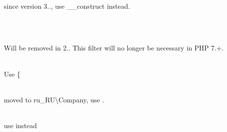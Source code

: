 \begin{DoxyRefList}
\item[Member \doxylink{class_cron_1_1_cron_expression_a20d1a6bb582a486fc44bc1de684496a1}{Cron\textbackslash{}Cron\+Expression\+::factory} (string \$expression, ?\doxylink{interface_cron_1_1_field_factory_interface}{Field\+Factory\+Interface} \$field\+Factory=null)]\hfill \\
\label{deprecated__deprecated000003}%
%
since version 3.., use \+\_\+\+\_\+construct instead.  
\item[Member \doxylink{class_cron_1_1_cron_expression_a793ba54d32ff10407653dd9ece004d34}{Cron\textbackslash{}Cron\+Expression\+::YEAR} ]\hfill \\
\label{deprecated__deprecated000002}%
%
  
\item[Class \doxylink{class_deep_copy_1_1_type_filter_1_1_date_1_1_date_interval_filter}{Deep\+Copy\textbackslash{}Type\+Filter\textbackslash{}Date\textbackslash{}Date\+Interval\+Filter} ]\hfill \\
\label{deprecated__deprecated000127}%
%
Will be removed in 2.. This filter will no longer be necessary in PHP 7.+.  
\item[Class \doxylink{class_deep_copy_1_1_type_filter_1_1_spl_1_1_spl_doubly_linked_list}{Deep\+Copy\textbackslash{}Type\+Filter\textbackslash{}Spl\textbackslash{}Spl\+Doubly\+Linked\+List} ]\hfill \\
\label{deprecated__deprecated000128}%
%
Use \{ 
\item[Class \doxylink{class_faker_1_1_calculator_1_1_inn}{Faker\textbackslash{}Calculator\textbackslash{}Inn} ]\hfill \\
\label{deprecated__deprecated000004}%
%
moved to ru\+\_\+\+RU\textbackslash{}\+Company, use {\ttfamily {}}.  
\item[Member \doxylink{class_faker_1_1_calculator_1_1_inn_ad248bfec01dab50a672624f6e08cd11a}{Faker\textbackslash{}Calculator\textbackslash{}Inn\+::checksum} (\$inn)]\hfill \\
\label{deprecated__deprecated000005}%
%
use {\ttfamily \doxylink{}{()}} instead  
\item[Member \doxylink{class_faker_1_1_calculator_1_1_inn_adbe4b737b321bf71a11d493f8c81c689}{Faker\textbackslash{}Calculator\textbackslash{}Inn\+::is\+Valid} (\$inn)]\hfill \\

\end{DoxyRefList}
